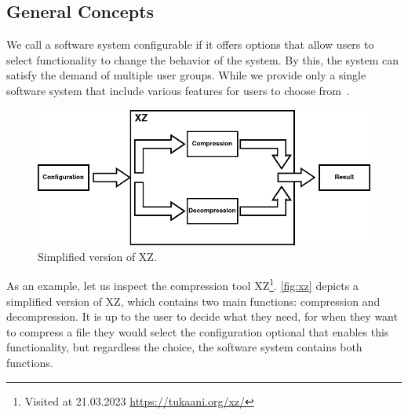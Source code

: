 \subsection{General Concepts}\label{ch:general-concepts}
We call a software system configurable if it offers options that allow users to select functionality to change the behavior of the system. %
By this, the system can satisfy the demand of multiple user groups. 
While we provide only a single software system that include various features for users to choose from~\cite{TooManyKnobs}.


\begin{figure}[h]
    \centering
    \includegraphics[scale=0.55]{gfx/ConfigurableSystemXZ.png}
    \caption{Simplified version of \textsc{XZ}.}
    \label{fig:xz}
\end{figure}

As an example, let us inspect the compression tool \textsc{XZ}\footnote{Visited at 21.03.2023 \url{https://tukaani.org/xz/}}.
\autoref{fig:xz} depicts a simplified version of \textsc{XZ}, which contains two main functions: compression and decompression. 
It is up to the user to decide what they need, for when they want to compress a file they would select the configuration optional
that enables this functionality, but regardless the choice, the software system contains both functions.
